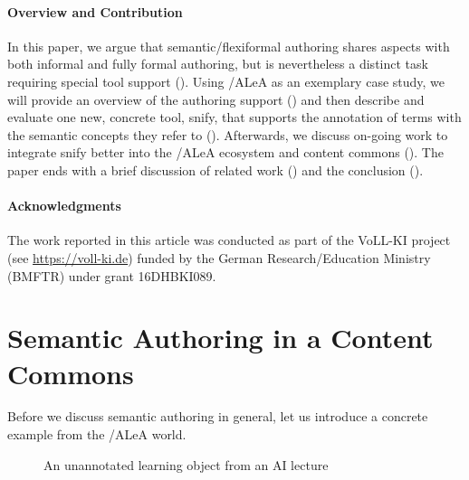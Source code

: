 \documentclass[runningheads]{llncs}
\newcommand\ALeA{\textsf{ALeA}\xspace}
\newcommand\snify{\textsf{snify}\xspace}
\begin{document}
\paragraph{Overview and Contribution}
In this paper, we argue that semantic/flexiformal authoring shares aspects with both informal and fully formal authoring,
but is nevertheless a distinct task requiring special tool support ().
Using \sTeX/\ALeA as an exemplary case study,
we will provide an overview of the authoring support ()
and then describe and evaluate one new, concrete tool, \snify, that supports the annotation
of terms with the semantic concepts they refer to ().
Afterwards, we discuss on-going work to integrate \snify better
into the \sTeX/\ALeA ecosystem and content commons ().
The paper ends with a brief discussion of related work () and the conclusion ().


\paragraph{Acknowledgments}
The work reported in this article was conducted as part of the VoLL-KI project (see
\url{https://voll-ki.de}) funded by the German Research/Education Ministry (BMFTR) under
grant 16DHBKI089.

\section{Semantic Authoring in a Content Commons}\label{sec:semauth}

Before we discuss semantic authoring in general, let us introduce a concrete example from
the \sTeX/\ALeA world.

\begin{figure}[h]\centering
  \caption{An unannotated learning object from an AI lecture}\label{fig:lo}
\end{figure}
\end{document}
